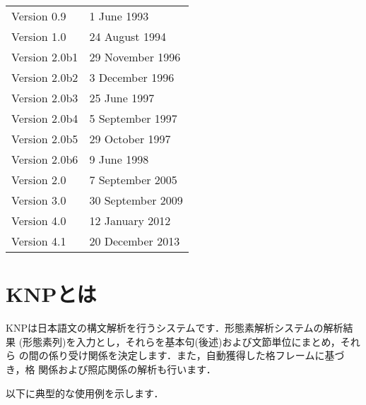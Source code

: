 \documentclass[a4j,11pt,titlepage]{jarticle}
\begin{document}
\begin{small}
\begin{tabular}{ll}
 Version 0.9 & 1 June 1993 \\
 Version 1.0 & 24 August 1994 \\
 Version 2.0b1 & 29 November 1996 \\
 Version 2.0b2 & 3 December 1996 \\
 Version 2.0b3 & 25 June 1997 \\
 Version 2.0b4 & 5 September 1997 \\
 Version 2.0b5 & 29 October 1997 \\
 Version 2.0b6 & 9 June 1998 \\
 Version 2.0 & 7 September 2005 \\
 Version 3.0 & 30 September 2009 \\
 Version 4.0 & 12 January 2012 \\
 Version 4.1 & 20 December 2013 \\
\end{tabular}
\end{small}

\clearpage

\tableofcontents

\clearpage
{}

\section{KNPとは}

KNPは日本語文の構文解析を行うシステムです．形態素解析システムの解析結果
(形態素列)を入力とし，それらを基本句(後述)および文節単位にまとめ，それら
の間の係り受け関係を決定します．また，自動獲得した格フレームに基づき，格
関係および照応関係の解析も行います．

以下に典型的な使用例を示します．
\end{document}
